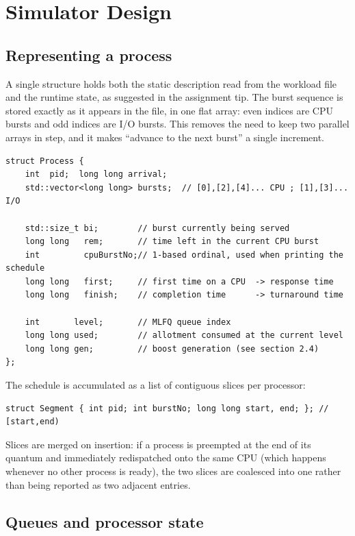 \documentclass[11pt,a4paper]{article}
\begin{document}
\section{Simulator Design}

\subsection{Representing a process}

A single structure holds both the static description read from the workload
file and the runtime state, as suggested in the assignment tip. The burst
sequence is stored exactly as it appears in the file, in one flat array: even
indices are CPU bursts and odd indices are I/O bursts. This removes the need to
keep two parallel arrays in step, and it makes ``advance to the next burst''
a single increment.

\begin{lstlisting}
struct Process {
    int  pid;  long long arrival;
    std::vector<long long> bursts;  // [0],[2],[4]... CPU ; [1],[3]... I/O

    std::size_t bi;        // burst currently being served
    long long   rem;       // time left in the current CPU burst
    int         cpuBurstNo;// 1-based ordinal, used when printing the schedule
    long long   first;     // first time on a CPU  -> response time
    long long   finish;    // completion time      -> turnaround time

    int       level;       // MLFQ queue index
    long long used;        // allotment consumed at the current level
    long long gen;         // boost generation (see section 2.4)
};
\end{lstlisting}

The schedule is accumulated as a list of contiguous slices per processor:

\begin{lstlisting}
struct Segment { int pid; int burstNo; long long start, end; }; // [start,end)
\end{lstlisting}

Slices are merged on insertion: if a process is preempted at the end of its
quantum and immediately redispatched onto the same CPU (which happens whenever
no other process is ready), the two slices are coalesced into one rather than
being reported as two adjacent entries.

\subsection{Queues and processor state}
\end{document}
